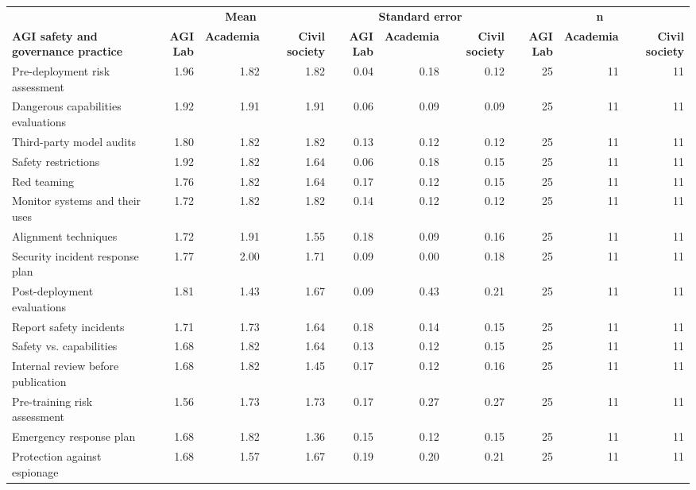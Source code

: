 \documentclass{article}
\begin{document}
\begin{sidewaystable}
    \centering
    \fontsize{6}{8}\selectfont
    \begin{tabular}{l*{9}{r}}
        \toprule
        & \multicolumn{3}{c}{\textbf{Mean}} & \multicolumn{3}{c}{\textbf{Standard error}} & \multicolumn{3}{c}{\textbf{n}} \\
        \cmidrule(lr){2-4} \cmidrule(lr){5-7} \cmidrule(lr){8-10}
        \textbf{AGI safety and governance practice} & \textbf{AGI Lab} & \textbf{Academia} & \textbf{Civil society} & \textbf{AGI Lab} & \textbf{Academia} & \textbf{Civil society} & \textbf{AGI Lab} & \textbf{Academia} & \textbf{Civil society} \\
        \midrule
        Pre-deployment risk assessment & 1.96 & 1.82 & 1.82 & 0.04 & 0.18 & 0.12 & 25 & 11 & 11 \\
Dangerous capabilities evaluations & 1.92 & 1.91 & 1.91 & 0.06 & 0.09 & 0.09 & 25 & 11 & 11 \\
Third-party model audits & 1.80 & 1.82 & 1.82 & 0.13 & 0.12 & 0.12 & 25 & 11 & 11 \\
Safety restrictions & 1.92 & 1.82 & 1.64 & 0.06 & 0.18 & 0.15 & 25 & 11 & 11 \\
Red teaming & 1.76 & 1.82 & 1.64 & 0.17 & 0.12 & 0.15 & 25 & 11 & 11 \\
Monitor systems and their uses & 1.72 & 1.82 & 1.82 & 0.14 & 0.12 & 0.12 & 25 & 11 & 11 \\
Alignment techniques & 1.72 & 1.91 & 1.55 & 0.18 & 0.09 & 0.16 & 25 & 11 & 11 \\
Security incident response plan & 1.77 & 2.00 & 1.71 & 0.09 & 0.00 & 0.18 & 25 & 11 & 11 \\
Post-deployment evaluations & 1.81 & 1.43 & 1.67 & 0.09 & 0.43 & 0.21 & 25 & 11 & 11 \\
Report safety incidents & 1.71 & 1.73 & 1.64 & 0.18 & 0.14 & 0.15 & 25 & 11 & 11 \\
Safety vs. capabilities & 1.68 & 1.82 & 1.64 & 0.13 & 0.12 & 0.15 & 25 & 11 & 11 \\
Internal review before publication & 1.68 & 1.82 & 1.45 & 0.17 & 0.12 & 0.16 & 25 & 11 & 11 \\
Pre-training risk assessment & 1.56 & 1.73 & 1.73 & 0.17 & 0.27 & 0.27 & 25 & 11 & 11 \\
Emergency response plan & 1.68 & 1.82 & 1.36 & 0.15 & 0.12 & 0.15 & 25 & 11 & 11 \\
Protection against espionage & 1.68 & 1.57 & 1.67 & 0.19 & 0.20 & 0.21 & 25 & 11 & 11 \\

\end{tabular}
\end{sidewaystable}
\end{document}
